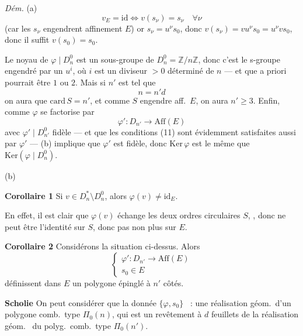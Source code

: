 \documentclass[11pt,a4paper]{article}
\begin{document}
\textit{Dém.} (a)
\[
  v_E = \mathrm{id} \iff v(s_\nu) = s_\nu \quad \forall \nu
\]
(car les $s_\nu$ engendrent affinement $E$) or $s_\nu = u^{\nu} s_0$, donc $v(s_\nu) = v u^{\nu} s_0 = u^{\nu} v s_0$, donc il suffit $v(s_0) = s_0$.

 Le noyau de $\varphi \mid D_n^{0}$ est un sous-groupe de $D_n^{0} = \mathbb{Z}/n\mathbb{Z}$, donc  c'est le s-groupe engendré par un $u^{i}$, où $i$ est un diviseur $> 0$ déterminé de $n$ --- et que a priori pourrait être $1$ ou $2$. Mais si  $n'$ est tel que
\[
  n = n' d
\]
  on aura que \ill{} $\mathrm{card}\, S = n'$, et comme $S$ engendre aff.\ $E$, on aura $n' \geq 3$. Enfin, comme $\varphi$ se factorise par
\[
  \varphi' : D_{n'} \longrightarrow \mathrm{Aff}(E)
\]
avec $\varphi' \mid D_{n'}^{0}$ fidèle --- et que les conditions (11) sont évidemment satisfaites aussi par $\varphi'$ --- (b) implique que $\varphi'$ est fidèle, donc $\mathrm{Ker}\, \varphi$ est le même que $\mathrm{Ker}(\varphi \mid D_n^{0})$.

(b) 

\textbf{Corollaire 1} Si $v \in D_n^{*} \setminus D_n^{0}$, alors $\varphi(v) \neq \mathrm{id}_E$.

En effet,  il est clair que $\varphi(v)$ échange les deux ordres circulaires   $S$, , donc ne peut être l'identité sur $S$,  donc pas non plus sur $E$.

\textbf{Corollaire 2} Considérons la situation  ci-dessus. Alors 
\[
  \begin{cases}
    \varphi' : D_{n'} \longrightarrow \mathrm{Aff}(E) \\
    s_0 \in E
  \end{cases}
\]
définissent dans $E$ un polygone épinglé à $n'$ côtés.

\textbf{Scholie} On peut considérer que la donnée $\{\varphi, s_0\}$ ~: une réalisation géom.\ d'un polygone comb.\ type $\Pi_0(n)$, qui est un revêtement à $d$ feuillets de la réalisation géom.\   du polyg.\ comb.\ type $\Pi_0(n')$.
\end{document}
